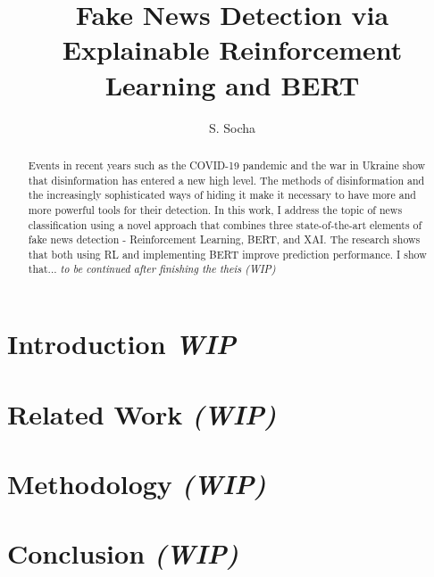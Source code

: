 \documentclass[
  journal=largetwo,
  manuscript=article-type,
  year=2023,
  volume=1,
]{cup-journal}
\title{Fake News Detection via Explainable Reinforcement Learning and BERT}
\author{S. Socha}
\affiliation{Faculty of Economic Sciences, University of Warsaw, Warsaw, Poland}
\begin{document}
\begin{abstract}
Events in recent years such as the COVID-19 pandemic and the war in Ukraine show that disinformation has entered a new high level. The methods of disinformation and the increasingly sophisticated ways of hiding it make it necessary to have more and more powerful tools for their detection. In this work, I address the topic of news classification using a novel approach that combines three state-of-the-art elements of fake news detection - Reinforcement Learning, BERT, and XAI. The research shows that both using RL and implementing BERT improve prediction performance. I show that... \textit{to be continued after finishing the theis (WIP)}
\end{abstract}


\section{Introduction \textit{WIP}}


\section{Related Work \textit{(WIP)}}


\section{Methodology \textit{(WIP)}}


\section{Conclusion \textit{(WIP)}}




\printendnotes

\printbibliography
\end{document}
